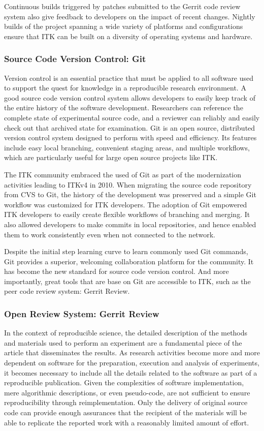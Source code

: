 \documentclass{frontiersENG} %
\begin{document}
Continuous builds triggered by patches submitted to the Gerrit code review
system also give feedback to developers on the impact of recent changes.
Nightly builds of the project spanning a wide variety of platforms and
configurations ensure that ITK can be built on a diversity of operating systems
and hardware.


\subsubsection{Source Code Version Control: Git}
Version control is an essential practice that must be applied to all software
used to support the quest for knowledge in a reproducible research environment.
A good source code version control system allows developers to easily keep
track of the entire history of the software development. Researchers can
reference the complete state of experimental source code, and a reviewer can
reliably and easily check out that archived state for examination.  Git is an
open source, distributed version control system designed to perform with speed
and efficiency. Its features include easy local branching, convenient staging
areas, and multiple workflows, which are particularly useful for large open
source projects like ITK.

The ITK community embraced the used of Git as part of the modernization
activities leading to ITKv4 in 2010.  When migrating the source code repository
from CVS to Git, the history of the development was preserved and a simple Git
workflow was customized for ITK developers.  The adoption of Git empowered ITK
developers to easily create flexible workflows of branching and merging. It
also allowed developers to make commits in local repositories, and hence
enabled them to work consistently even when not connected to the network.

Despite the initial step learning curve to learn commonly used Git commands,
Git provides a superior, welcoming collaboration platform for the community. It
has become the new standard for source code version control.  And more
importantly, great tools that are base on Git are accessible to ITK, such as
the peer code review system: Gerrit Review.


\subsubsection{Open Review System: Gerrit Review}

In the context of reproducible science, the detailed description of the methods
and materials used to perform an experiment are a fundamental piece of the
article that disseminates the results. As research activities become more and
more dependent on software for the preparation, execution and analysis of
experiments, it becomes necessary to include all the details related to the
software as part of a reproducible publication. Given the complexities of
software implementation, mere algorithmic descriptions, or even pseudo-code,
are not sufficient to ensure reproducibility through reimplementation. Only the
delivery of original source code can provide enough assurances that the
recipient of the materials will be able to replicate the reported work with a
reasonably limited amount of effort.
\end{document}
